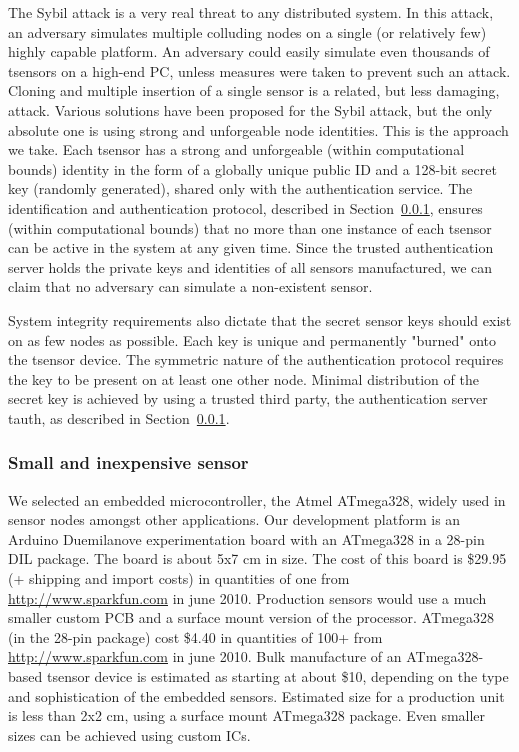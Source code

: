 The Sybil attack \cite{Douceur2002} is a very real threat to any distributed system. In this attack, an adversary simulates multiple colluding nodes on a single (or relatively few) highly capable platform. An adversary could easily simulate even thousands of tsensors on a high-end PC, unless measures were taken to prevent such an attack. Cloning and multiple insertion of a single sensor is a related, but less damaging, attack.
%
Various solutions have been proposed for the Sybil attack, but the only absolute one is using strong and unforgeable node identities. This is the approach we take. Each tsensor has a strong and unforgeable (within computational bounds) identity in the form of a globally unique public ID and a 128-bit secret key (randomly generated), shared only with the authentication service. The identification and authentication protocol, described in Section~\ref{}, ensures (within computational bounds) that no more than one instance of each tsensor can be active in the system at any given time. Since the trusted authentication server holds the private keys and identities of all sensors manufactured, we can claim that no adversary can simulate a non-existent sensor.

System integrity requirements also dictate that the secret sensor keys should exist on as few nodes as possible. Each key is unique and permanently "burned" onto the tsensor device. The symmetric nature of the authentication protocol requires the key to be present on at least one other node. Minimal distribution of the secret key is achieved by using a trusted third party, the authentication server tauth, as described in Section~\ref{}.

\subsubsection{Small and inexpensive sensor}

We selected an embedded microcontroller, the Atmel ATmega328, widely used in sensor nodes \cite{} amongst other applications. Our development platform is an Arduino Duemilanove experimentation board with an ATmega328 in a 28-pin DIL package. The board is about 5x7 cm in size.
The cost of this board is \$29.95 (+ shipping and import costs) in quantities of one from \url{http://www.sparkfun.com} in june 2010. 
%
Production sensors would use a much smaller custom PCB and a surface mount version of the processor. ATmega328 (in the 28-pin package) cost \$4.40 in quantities of 100+ from \url{http://www.sparkfun.com} in june 2010. Bulk manufacture of an ATmega328-based tsensor device is estimated as starting at about \$10, depending on the type and sophistication of the embedded sensors. Estimated size for a production unit is less than 2x2 cm, using a surface mount ATmega328 package. Even smaller sizes can be achieved using custom ICs. 

